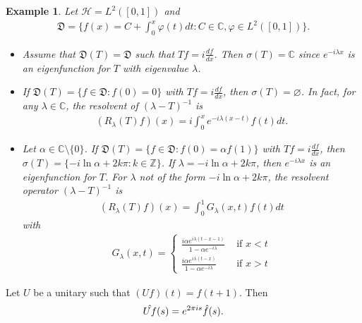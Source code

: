 \documentclass[a4paper,10pt]{amsart}
\newtheorem{example}{Example}[section]
\newcommand{\HHH}{\mathcal H} %
\newcommand{\DDD}{\mathfrak D}
\newcommand{\C}{\mathbb C} %
\newcommand{\Z}{\mathbb Z} %
\begin{document}
\begin{example}
    Let $\HHH = L^{2}([0,1])$ and
    \begin{align*}
        \DDD = \{f(x) = C + \int_{0}^{x}\varphi(t)dt : C \in \C, 
        \varphi \in L^{2}([0,1]) \}.
    \end{align*}
    \begin{itemize}
        \item Assume that $\DDD(T) = \DDD$ such that
            $Tf = i\frac{df}{dx}$. Then $\sigma(T) = \C$ since
            $e^{-i\lambda x}$ is an eigenfunction for $T$ with
            eigenvalue $\lambda$.
        \item If $\DDD(T) = \{f \in \DDD: f(0) = 0\}$ with
            $Tf = i\frac{df}{dx}$, then $\sigma(T) = \varnothing$.
            In fact, for any $\lambda \in \C$, the resolvent of 
            $(\lambda - T)^{-1}$ is
            \begin{align*}
                (R_{\lambda}(T)f)(x) = i \int_{0}^{x}e^{-i\lambda(x-t)}
                f(t)dt.
            \end{align*}
        \item Let $\alpha \in \C \setminus \{0\}$. If
            $\DDD(T) = \{f \in \DDD : f(0) = \alpha f(1) \}$ with
            $Tf = i\frac{df}{dx}$, then $\sigma(T) = 
            \{-i \ln \alpha + 2k\pi : k \in \Z\}$. 
            If $\lambda = -i \ln \alpha + 2k\pi$, then $e^{-i\lambda x}$
            is an eigenfunction for $T$. For $\lambda$ not of 
            the form $-i \ln \alpha + 2k\pi$, the resolvent operator
            $(\lambda - T)^{-1}$ is 
            \begin{align*}
                (R_{\lambda}(T)f)(x) = \int_{0}^{1} G_{\lambda}(x,t)f(t)dt 
            \end{align*}
            with
            \begin{align*}
                G_{\lambda}(x,t) = 
                \begin{cases}
                    \frac{i\alpha e^{i\lambda(t-x-1)}}
                    {1-\alpha e^{-i\lambda}} & \mbox{ if $x < t$} \\
                    \frac{i\alpha e^{i\lambda(t-x)}}
                    {1-\alpha e^{-i\lambda}} & \mbox{ if $x > t$}
                \end{cases}
            \end{align*}
    \end{itemize}
\end{example}

Let $U$ be a unitary such that $(Uf)(t) = f(t+1)$. Then
\begin{align*}
    \Hat{Uf}(s) = e^{2\pi i s}\Hat{f}(s). 
\end{align*}
\end{document}
